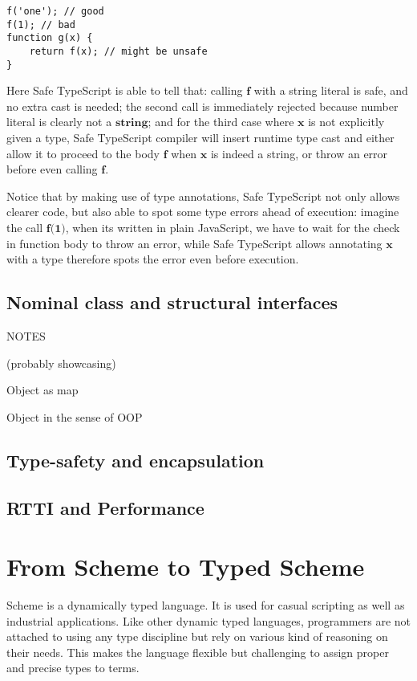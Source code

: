 \begin{verbatim}
f('one'); // good
f(1); // bad
function g(x) {
    return f(x); // might be unsafe
}
\end{verbatim}

Here Safe TypeScript is able to tell that: calling $\textbf{f}$ with a string literal
is safe, and no extra cast is needed; the second call is immediately rejected
because number literal is clearly not a $\textbf{string}$;
and for the third case where $\textbf{x}$
is not explicitly given a type, Safe TypeScript compiler will insert runtime type cast
and either allow it to proceed to the body $\textbf{f}$ when $\textbf{x}$ is indeed a string,
or throw an error before even calling $\textbf{f}$.

Notice that by making use of type annotations, Safe TypeScript not only allows
clearer code, but also able to spot some type errors ahead of execution:
imagine the call $\textbf{f(1)}$, when its written in plain JavaScript,
we have to wait for the check in function body to throw an error,
while Safe TypeScript allows annotating $\textbf{x}$ with a type
therefore spots the error even before execution.

\subsection{Nominal class and structural interfaces}

NOTES

(probably showcasing)

Object as map

Object in the sense of OOP

\subsection{Type-safety and encapsulation}

\subsection{RTTI and Performance}


\section{From Scheme to Typed Scheme}

Scheme is a dynamically typed language.
It is used for casual scripting as well as industrial applications.
Like other dynamic typed languages, programmers are not attached to using any
type discipline but rely on various kind of reasoning on their needs.
This makes the language flexible but challenging to assign proper and precise types to terms.

